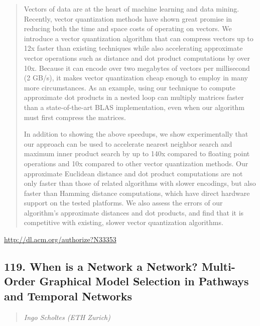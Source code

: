 \documentclass{article}
\begin{document}
\begin{quote}
Vectors of data are at the heart of machine learning and data mining. Recently, vector quantization methods have shown great promise in reducing both the time and space costs of operating on vectors. We introduce a vector quantization algorithm that can compress vectors up to 12x faster than existing techniques while also accelerating approximate vector operations such as distance and dot product computations by over 10x. Because it can encode over two megabytes of vectors per millisecond (2 GB/s), it makes vector quantization cheap enough to employ in many more circumstances. As an example, using our technique to compute approximate dot products in a nested loop can multiply matrices faster than a state-of-the-art BLAS implementation, even when our algorithm must first compress the matrices.







  In addition to showing the above speedups, we show experimentally that our approach can be used to accelerate nearest neighbor search and maximum inner product search by up to 140x compared to floating point operations and 10x compared to other vector quantization methods. Our approximate Euclidean distance and dot product computations are not only faster than those of related algorithms with slower encodings, but also faster than Hamming distance computations, which have direct hardware support on the tested platforms. We also assess the errors of our algorithm’s approximate distances and dot products, and find that it is competitive with existing, slower vector quantization algorithms.
\end{quote}

\href{http://dl.acm.org/authorize?N33353}{http://dl.acm.org/authorize?N33353}

\subsection{119. When is a Network a Network? Multi-Order Graphical Model Selection in Pathways and Temporal Networks}

\begin{quote}
\footnotesize{\textit{Ingo Scholtes (ETH Zurich)}}

\end{quote}
\end{document}
